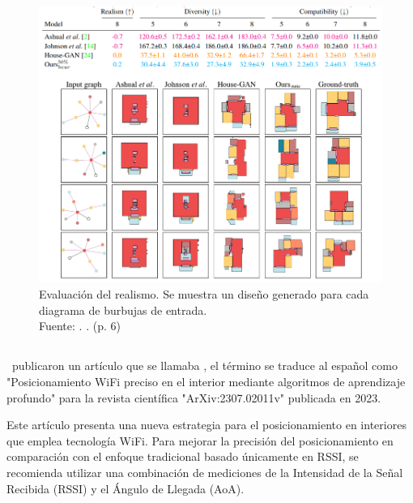 \begin{figure}[!ht]
	\begin{center}
		\includegraphics[width=1.1\textwidth]{2/figures/nauata2021_2.png}
		\caption[Evaluación del realismo. Se muestra un diseño generado para cada diagrama de burbujas de entrada]{Evaluación del realismo. Se muestra un diseño generado para cada diagrama de burbujas de entrada.\\
			Fuente: \cite{pr_nauata2021housegan}. . (p. 6)}
		\label{2:fig116}
	\end{center}
\end{figure}

\subsection{}
\cite{pr_cai2023precisewifi} publicaron un artículo que se llamaba , el término se traduce al español como "Posicionamiento WiFi preciso en el interior mediante algoritmos de aprendizaje profundo" para la revista científica "ArXiv:2307.02011v" publicada en 2023.

Este artículo presenta una nueva estrategia para el posicionamiento en interiores que emplea tecnología WiFi. Para mejorar la precisión del posicionamiento en comparación con el enfoque tradicional basado únicamente en RSSI, se recomienda utilizar una combinación de mediciones de la Intensidad de la Señal Recibida (RSSI) y el Ángulo de Llegada (AoA).

